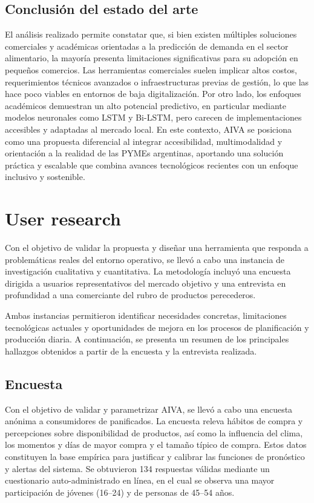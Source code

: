\subsection{Conclusión del estado del arte}
El análisis realizado permite constatar que, si bien existen múltiples soluciones comerciales y académicas orientadas a la predicción de demanda en el sector alimentario, la mayoría presenta limitaciones significativas para su adopción en pequeños comercios. Las herramientas comerciales suelen implicar altos costos, requerimientos técnicos avanzados o infraestructuras previas de gestión, lo que las hace poco viables en entornos de baja digitalización. Por otro lado, los enfoques académicos demuestran un alto potencial predictivo, en particular mediante modelos neuronales como LSTM y Bi-LSTM, pero carecen de implementaciones accesibles y adaptadas al mercado local. En este contexto, AIVA se posiciona como una propuesta diferencial al integrar accesibilidad, multimodalidad y orientación a la realidad de las PYMEs argentinas, aportando una solución práctica y escalable que combina avances tecnológicos recientes con un enfoque inclusivo y sostenible.

\newpage %

\section{User research}

Con el objetivo de validar la propuesta y diseñar una herramienta que responda a problemáticas reales del entorno operativo, se llevó a cabo una instancia de investigación cualitativa y cuantitativa. La metodología incluyó una encuesta dirigida a usuarios representativos del mercado objetivo y una entrevista en profundidad a una comerciante del rubro de productos perecederos.  

Ambas instancias permitieron identificar necesidades concretas, limitaciones tecnológicas actuales y oportunidades de mejora en los procesos de planificación y producción diaria. A continuación, se presenta un resumen de los principales hallazgos obtenidos a partir de la encuesta y la entrevista realizada.


\subsection{Encuesta}

Con el objetivo de validar y parametrizar AIVA, se llevó a cabo una encuesta anónima a consumidores de panificados. La encuesta releva hábitos de compra y percepciones sobre disponibilidad de productos, así como la influencia del clima, los momentos y días de mayor compra y el tamaño típico de compra. Estos datos constituyen la base empírica para justificar y calibrar las funciones de pronóstico y alertas del sistema. Se obtuvieron 134 respuestas válidas mediante un cuestionario auto-administrado en línea, en el cual se observa una mayor participación de jóvenes (16–24) y de personas de 45–54 años.

